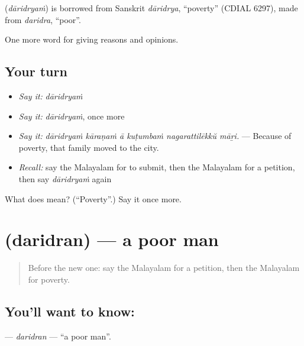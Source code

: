 \begin{cousinweb}
\textbf{} (\emph{dāridryaṁ}) is borrowed from Sanskrit \emph{dāridrya}, \textquotedblleft{}poverty\textquotedblright{} (CDIAL 6297), made from \emph{daridra}, \textquotedblleft{}poor\textquotedblright{}.
\end{cousinweb}

\begin{grammarlens}[title={What you've built}]
One more word for giving reasons and opinions.
\end{grammarlens}

\subsection*{Your turn}
\begin{itemize}
\raggedright
  \item \emph{Say it:} \emph{dāridryaṁ}
  \item \emph{Say it:} \emph{dāridryaṁ}, once more
  \item \emph{Say it:} \emph{dāridryaṁ kāraṇaṁ ā kuṭumbaṁ nagarattilēkkŭ māṟi.} — Because of poverty, that family moved to the city.
  \item \emph{Recall:} say the Malayalam for to submit, then the Malayalam for a petition, then say \emph{dāridryaṁ} again
\end{itemize}

\begin{tcolorbox}[breakable,colback=teal!4,colframe=teal!35!black,title={Before you move on}]
What does  mean? (\textquotedblleft{}Poverty\textquotedblright{}.) Say it once more.
\end{tcolorbox}
\section[\texorpdfstring{\ml{ദരിദ്രൻ} (daridran)}{ദരിദ്രൻ (daridran)}]{ (daridran) — a poor man}

\label{lesson:ML-C427-daridran}



\begin{quote}
Before the new one: say the Malayalam for a petition, then the Malayalam for poverty.
\end{quote}

\subsection*{You'll want to know: }
\textbf{} — \emph{daridran} — \textquotedblleft{}a poor man\textquotedblright{}.

